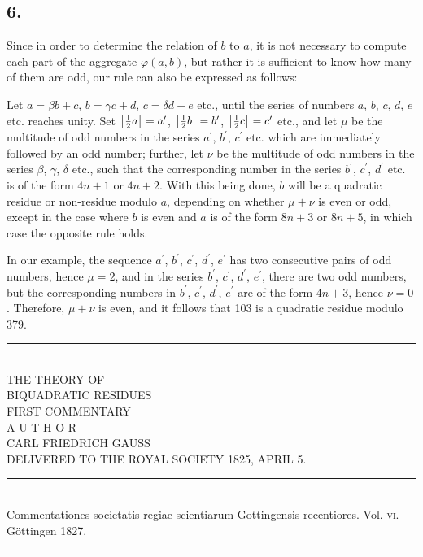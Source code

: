 \documentclass[twoside,12pt]{memoir}
\let\oldfrac\frac
\def\frac#1#2{\mathchoice{\tfrac{#1}{#2}}{\oldfrac{#1}{#2}}{\genfrac{}{}{}{2}{#1}{#2\mathstrut}}{\genfrac{}{}{}{3}{#1}{#2\mathstrut}}}
\begin{document}
\subsection*{6.}

Since in order to determine the relation of \(b\) to \(a\), it is not necessary to compute each part of the aggregate \(\varphi(a, b)\), but rather it is sufficient to know how many of them are odd, our rule can also be expressed as follows:

Let \(a = \beta b+c\), \(b = \gamma c+d\), \(c = \delta d+e\) etc{.}, until the series of numbers \(a\), \(b\), \(c\), \(d\), \(e\) etc{.} reaches unity.  Set \(\left[\frac{1}{2} a\right]=a^{\prime}\), \(\left[\frac{1}{2} b\right]=b^{\prime}\), \(\left[\frac{1}{2} c\right]=c^{\prime}\) etc{.}, and let \(\mu\) be the multitude of odd numbers in the series \(a^{\prime}\), \(b^{\prime}\), \(c^{\prime}\) etc{.} which are immediately followed by an odd number; further, let \(\nu\) be the multitude of odd numbers in the series \(\beta\), \(\gamma\), \(\delta\) etc{.}, such that the corresponding number in the series \(b^{\prime}\), \(c^{\prime}\), \(d^{\prime}\) etc{.} is of the form \(4n+1\) or \(4n+2\). With this being done, \(b\) will be a quadratic residue or non-residue modulo \(a\), depending on whether \(\mu + \nu\) is even or odd, except in the case where \(b\) is even and \(a\) is of the form \(8n+3\) or \(8n+5\), in which case the opposite rule holds.

In our example, the sequence \(a^{\prime}\), \(b^{\prime}\), \(c^{\prime}\), \(d^{\prime}\), \(e^{\prime}\) has two consecutive pairs of odd numbers, hence \(\mu =2\), and in the series \(b^{\prime}\), \(c^{\prime}\), \(d^{\prime}\), \(e^{\prime}\), there are two odd numbers, but the corresponding numbers in \(b^{\prime}\), \(c^{\prime}\), \(d^{\prime}\), \(e^{\prime}\) are of the form \(4n+3\), hence \(\nu = 0\). Therefore, \(\mu + \nu\) is even, and it follows that 103 is a quadratic residue modulo 379.\\[1.5\baselineskip]
\begin{center}\rule{1.5in}{0.5pt}\end{center}
\pagebreak%

\begin{center}
\;\\[4\baselineskip]
{\large THE THEORY OF }\\[\baselineskip]
{\LARGE BIQUADRATIC RESIDUES }\\[3\baselineskip]
{\large FIRST COMMENTARY}\\[2.5\baselineskip]
{\tiny A U T H O R}\\[1.5\baselineskip]
CARL FRIEDRICH GAUSS\\[1.5\baselineskip]
{\scriptsize DELIVERED TO THE ROYAL SOCIETY {\tiny \textsc{1825},} APRIL {\tiny \textsc{5}.}}\\[4\baselineskip]
\rule{4in}{0.5pt}\\[0.5\baselineskip]
{\small Commentationes societatis regiae scientiarum Gottingensis recentiores. Vol. \textsc{vi}.\\
Göttingen \textsc{1827}.}\\
\rule{4in}{0.5pt}
\end{center}
\pagebreak%
\;\pagebreak%
\end{document}
